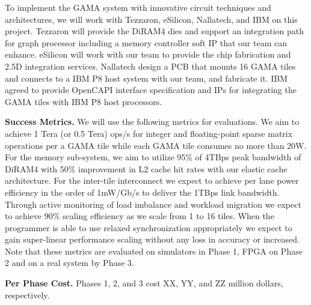 

To implement the GAMA system with innovative circuit techniques and architectures, 
we will work with Tezzaron, eSilicon, Nallatech, and IBM on this project. 
Tezzaron will provide the DiRAM4 dies and support an integration path for graph processor including a memory controller soft IP that our team can enhance.
eSilicon will work with our team to provide the chip fabrication and 2.5D integration services.
Nallatech design a PCB that mounts 16 GAMA tiles and connects to a IBM P8 host system with our team, and fabricate it.
IBM agreed to provide OpenCAPI interface specification and IPs for integrating the GAMA tiles with IBM P8 host processors. 

\vspace{3pt}
\noindent
\textbf{Success Metrics.} 
We will use the following metrics for evaluations.
We aim to achieve 1 Tera (or 0.5 Tera) ops/s for integer and floating-point sparse matrix operations per a GAMA tile while each GAMA tile consumes no more than 20W.
For the memory sub-system, we aim to utilize 95\% of 4TBps peak bandwidth of DiRAM4 with 50\% improvement in L2 cache hit rates with our elastic cache architecture.
For the inter-tile interconnect we expect to achieve per lane power efficiency in the order of 1mW/Gb/s to deliver the 1TBps link bandwidth. %
Through active monitoring of load imbalance and workload migration we expect to achieve 90\% scaling efficiency as we scale from 1 to 16 tiles. 
When the programmer is able to use relaxed synchronization appropriately we expect to gain super-linear performance scaling without any loss in accuracy or increased.  
Note that these metrics are evaluated on simulators in Phase 1, FPGA on Phase 2 and on a real system by Phase 3.  


\vspace{3pt}
\noindent
\textbf{Per Phase Cost.} 
Phases 1, 2, and 3 cost XX, YY, and ZZ million dollars, respectively.

